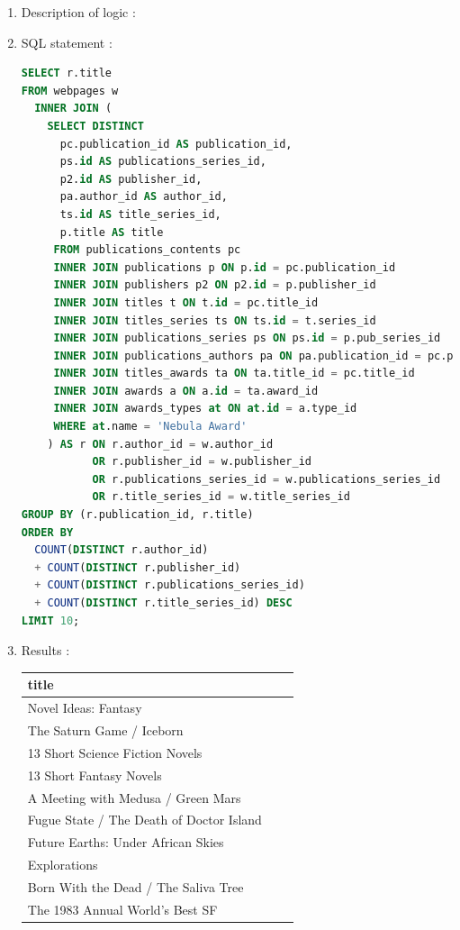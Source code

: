 \documentclass[doubleside, titlepage]{article}
\begin{document}
	\begin{enumerate}
	\item Description of logic : 
	\item SQL statement :
		\begin{lstlisting}[language=SQL,showspaces=false,basicstyle=\ttfamily,numberstyle=\tiny,commentstyle=\color{gray}]
SELECT r.title
FROM webpages w
  INNER JOIN (
    SELECT DISTINCT
      pc.publication_id AS publication_id,
      ps.id AS publications_series_id,
      p2.id AS publisher_id,
      pa.author_id AS author_id,
      ts.id AS title_series_id,
      p.title AS title
     FROM publications_contents pc
     INNER JOIN publications p ON p.id = pc.publication_id
     INNER JOIN publishers p2 ON p2.id = p.publisher_id
     INNER JOIN titles t ON t.id = pc.title_id
     INNER JOIN titles_series ts ON ts.id = t.series_id
     INNER JOIN publications_series ps ON ps.id = p.pub_series_id
     INNER JOIN publications_authors pa ON pa.publication_id = pc.publication_id
     INNER JOIN titles_awards ta ON ta.title_id = pc.title_id
     INNER JOIN awards a ON a.id = ta.award_id
     INNER JOIN awards_types at ON at.id = a.type_id
     WHERE at.name = 'Nebula Award'
    ) AS r ON r.author_id = w.author_id
           OR r.publisher_id = w.publisher_id
           OR r.publications_series_id = w.publications_series_id
           OR r.title_series_id = w.title_series_id
GROUP BY (r.publication_id, r.title)
ORDER BY
  COUNT(DISTINCT r.author_id)
  + COUNT(DISTINCT r.publisher_id)
  + COUNT(DISTINCT r.publications_series_id)
  + COUNT(DISTINCT r.title_series_id) DESC
LIMIT 10;
		\end{lstlisting}

	\item Results :\\

	\begin{tabular}{|l|c|r|}
	  \hline
		title\\
	  \hline
Novel Ideas: Fantasy\\
The Saturn Game / Iceborn\\
13 Short Science Fiction Novels\\
13 Short Fantasy Novels\\
A Meeting with Medusa / Green Mars\\
Fugue State / The Death of Doctor Island\\
Future Earths: Under African Skies\\
Explorations\\
Born With the Dead / The Saliva Tree\\
The 1983 Annual World's Best SF\\
	  \hline
	\end{tabular}
\end{enumerate}
\end{document}
